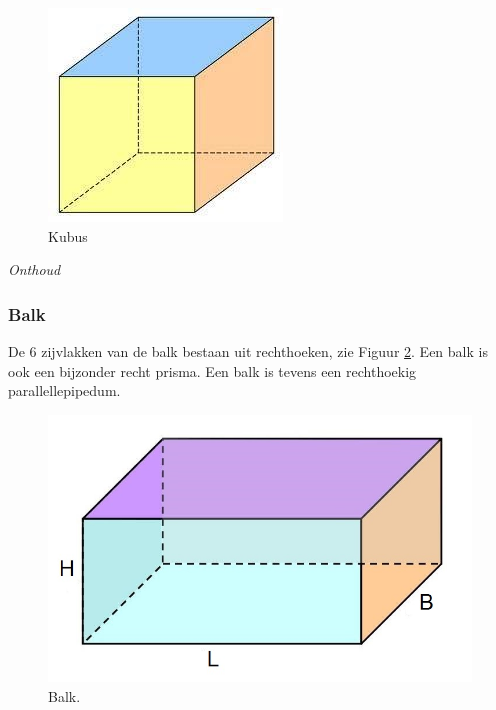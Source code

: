 \begin{figure}
	\centering
	\includegraphics[width=0.7\linewidth]{4_opp_inhoud_an_meetk/inputs/RuimteFigurenOppInhoud_kubus}
	\caption{Kubus}
	\label{fig:ruimtefigurenoppinhoudkubus}
\end{figure}


\emph{Onthoud}


\subsubsection{Balk}
De 6 zijvlakken van de balk bestaan uit rechthoeken, zie Figuur \ref{fig:ruimtefigurenoppinhoudbalk}. Een balk is ook een bijzonder recht prisma.
Een balk is tevens een rechthoekig parallellepipedum.

\begin{figure}
	\centering
	\includegraphics[width=0.7\linewidth]{4_opp_inhoud_an_meetk/inputs/RuimteFigurenOppInhoud_balk}
	\caption{Balk.}
	\label{fig:ruimtefigurenoppinhoudbalk}
\end{figure}


